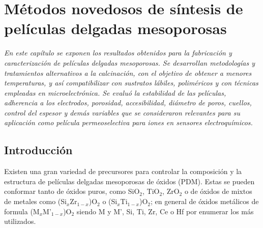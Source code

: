  \newcommand{\NoBiblioMeso}[1]{
 \ifthenelse{\equal{#1}{verdadero}}{}{}
 \NoBiblioMeso{verdadero}}

 
 \FormatoCapituloDosLineas
 
 \chapter{Métodos novedosos de síntesis de películas delgadas mesoporosas}
 \label{chap:Mesoporosos}

 \thispagestyle{empty}
	
 \noindent\textit{En este capítulo se exponen los resultados obtenidos para la fabricación y caracterización de películas delgadas mesoporosas. Se desarrollan metodologías y tratamientos alternativos a la calcinación, con el objetivo de obtener \pdm\space a menores temperaturas, y así compatibilizar con sustratos lábiles, poliméricos y con técnicas empleadas en microelectrónica. Se evaluó la estabilidad de las películas, adherencia a los electrodos, porosidad, accesibilidad, diámetro de poros, cuellos, control del espesor y demás variables que se consideraron relevantes para su aplicación como película permeoselectiva para iones en sensores electroquímicos.}
 
 \vfill
 \minitoc
 \newpage

\section{Introducción}

	Existen una gran variedad de precursores para controlar la composición y la estructura de películas delgadas mesoporosas de óxidos (PDM). Estas se pueden conformar tanto de óxidos puros, como SiO$_2$, TiO$_2$, ZrO$_2$ o de óxidos de mixtos de metales como (Si$_x$Zr$_{1-x}$)O$_2$ o (Si$_x$Ti$_{1-x}$)O$_2$; en general de óxidos metálicos de formula (M$_{x}$M'$_{1-x}$)O$_2$ siendo M y M', Si, Ti, Zr, Ce o Hf por enumerar los más utilizados.

